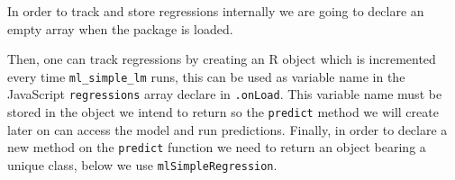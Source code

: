 \documentclass[
]{krantz}
\makeatletter
\newenvironment{Shaded}{\begin{snugshade}}{\end{snugshade}}
\newcommand{\CommentTok}[1]{\textcolor[rgb]{0.37,0.37,0.37}{\textit{#1}}}
\newcommand{\ControlFlowTok}[1]{\textcolor[rgb]{0.27,0.27,0.27}{\textbf{#1}}}
\newcommand{\DataTypeTok}[1]{\textcolor[rgb]{0.27,0.27,0.27}{#1}}
\newcommand{\KeywordTok}[1]{\textcolor[rgb]{0.27,0.27,0.27}{\textbf{#1}}}
\newcommand{\NormalTok}[1]{#1}
\newcommand{\OperatorTok}[1]{\textcolor[rgb]{0.43,0.43,0.43}{\textbf{#1}}}
\newcommand{\OtherTok}[1]{\textcolor[rgb]{0.37,0.37,0.37}{#1}}
\newcommand{\StringTok}[1]{\textcolor[rgb]{0.5,0.5,0.5}{#1}}
\newenvironment{kframe}{%
\medskip{}
\setlength{\fboxsep}{.8em}
 \def\at@end@of@kframe{}%
 \ifinner\ifhmode%
  \def\at@end@of@kframe{\end{minipage}}%
  \begin{minipage}{\columnwidth}%
 \fi\fi%
 \def\FrameCommand##1{\hskip\@totalleftmargin \hskip-\fboxsep
 \colorbox{shadecolor}{##1}\hskip-\fboxsep
     \hskip-\linewidth \hskip-\@totalleftmargin \hskip\columnwidth}%
 \MakeFramed {\advance\hsize-\width
   \@totalleftmargin\z@ \linewidth\hsize
   \@setminipage}}%
 {\par\unskip\endMakeFramed%
 \at@end@of@kframe}
\renewenvironment{Shaded}{\begin{kframe}}{\end{kframe}}
\makeatother
\begin{document}
In order to track and store regressions internally we are going to declare an empty array when the package is loaded.

\begin{Shaded}
\end{Shaded}

Then, one can track regressions by creating an R object which is incremented every time \texttt{ml\_simple\_lm} runs, this can be used as variable name in the JavaScript \texttt{regressions} array declare in \texttt{.onLoad}. This variable name must be stored in the object we intend to return so the \texttt{predict} method we will create later on can access the model and run predictions. Finally, in order to declare a new method on the \texttt{predict} function we need to return an object bearing a unique class, below we use \texttt{mlSimpleRegression}.
\end{document}
